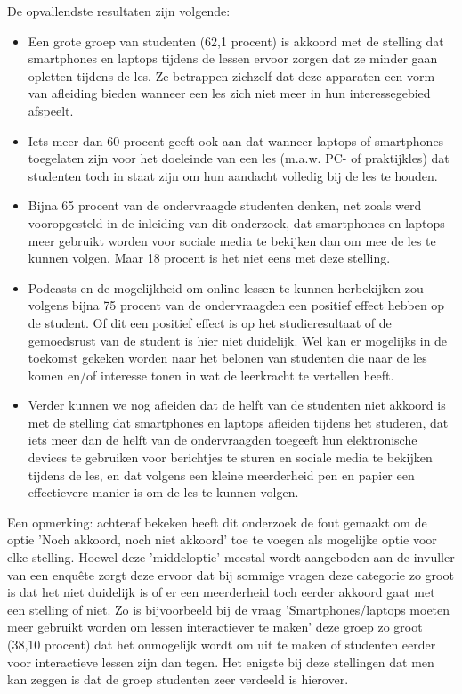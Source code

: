 De opvallendste resultaten zijn volgende:
\begin{itemize}
	\item Een grote groep van studenten (62,1 procent) is akkoord met de stelling dat smartphones en laptops tijdens de lessen ervoor zorgen dat ze minder gaan opletten tijdens de les. Ze betrappen zichzelf dat deze apparaten een vorm van afleiding bieden wanneer een les zich niet meer in hun interessegebied afspeelt.
	\item Iets meer dan 60 procent geeft ook aan dat wanneer laptops of smartphones toegelaten zijn voor het doeleinde van een les (m.a.w. PC- of praktijkles) dat studenten toch in staat zijn om hun aandacht volledig bij de les te houden. 
	\item Bijna 65 procent van de ondervraagde studenten denken, net zoals werd vooropgesteld in de inleiding van dit onderzoek, dat smartphones en laptops meer gebruikt worden voor sociale media te bekijken dan om mee de les te kunnen volgen. Maar 18 procent is het niet eens met deze stelling. 
	\item Podcasts en de mogelijkheid om online lessen te kunnen herbekijken zou volgens bijna 75 procent van de ondervraagden een positief effect hebben op de student. Of dit een positief effect is op het studieresultaat of de gemoedsrust van de student is hier niet duidelijk. Wel kan er mogelijks in de toekomst gekeken worden naar het belonen van studenten die naar de les komen en/of interesse tonen in wat de leerkracht te vertellen heeft.
	\item Verder kunnen we nog afleiden dat de helft van de studenten niet akkoord is met de stelling dat smartphones en laptops afleiden tijdens het studeren, dat iets meer dan de helft van de ondervraagden toegeeft hun elektronische devices te gebruiken voor berichtjes te sturen en sociale media te bekijken tijdens de les, en dat volgens een kleine meerderheid pen en papier een effectievere manier is om de les te kunnen volgen.
\end{itemize}

Een opmerking: achteraf bekeken heeft dit onderzoek de fout gemaakt om de optie 'Noch akkoord, noch niet akkoord' toe te voegen als mogelijke optie voor elke stelling. Hoewel deze 'middeloptie' meestal wordt aangeboden aan de invuller van een enquête zorgt deze ervoor dat bij sommige vragen deze categorie zo groot is dat het niet duidelijk is of er een meerderheid toch eerder akkoord gaat met een stelling of niet. Zo is bijvoorbeeld bij de vraag 'Smartphones/laptops moeten meer gebruikt worden om lessen interactiever te maken' deze groep zo groot (38,10 procent) dat het onmogelijk wordt om uit te maken of studenten eerder voor interactieve lessen zijn dan tegen. Het enigste bij deze stellingen dat men kan zeggen is dat de groep studenten zeer verdeeld is hierover.

